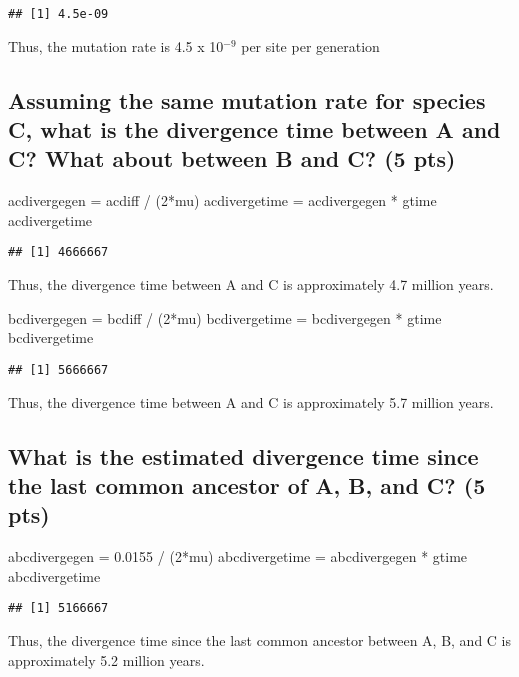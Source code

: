 \documentclass[]{article}
\newenvironment{Shaded}{\begin{snugshade}}{\end{snugshade}}
\newcommand{\DecValTok}[1]{\textcolor[rgb]{0.00,0.00,0.81}{{#1}}}
\newcommand{\FloatTok}[1]{\textcolor[rgb]{0.00,0.00,0.81}{{#1}}}
\newcommand{\StringTok}[1]{\textcolor[rgb]{0.31,0.60,0.02}{{#1}}}
\newcommand{\NormalTok}[1]{{#1}}
\begin{document}
\begin{verbatim}
## [1] 4.5e-09
\end{verbatim}

Thus, the mutation rate is 4.5 x 10$^{-9}$ per site per generation
\subsection{Assuming the same mutation rate for species C, what is the
divergence time between A and C? What about between B and C? (5 pts)}

\begin{Shaded}
\begin{Highlighting}[]
\NormalTok{acdivergegen =}\StringTok{ }\NormalTok{acdiff /}\StringTok{ }\NormalTok{(}\DecValTok{2}\NormalTok{*mu)}
\NormalTok{acdivergetime =}\StringTok{ }\NormalTok{acdivergegen *}\StringTok{ }\NormalTok{gtime}
\NormalTok{acdivergetime}
\end{Highlighting}
\end{Shaded}

\begin{verbatim}
## [1] 4666667
\end{verbatim}

Thus, the divergence time between A and C is approximately 4.7 million
years.

\begin{Shaded}
\begin{Highlighting}[]
\NormalTok{bcdivergegen =}\StringTok{ }\NormalTok{bcdiff /}\StringTok{ }\NormalTok{(}\DecValTok{2}\NormalTok{*mu)}
\NormalTok{bcdivergetime =}\StringTok{ }\NormalTok{bcdivergegen *}\StringTok{ }\NormalTok{gtime}
\NormalTok{bcdivergetime}
\end{Highlighting}
\end{Shaded}

\begin{verbatim}
## [1] 5666667
\end{verbatim}

Thus, the divergence time between A and C is approximately 5.7 million
years. 
\subsection{What is the estimated divergence time since the last common
ancestor of A, B, and C? (5 pts)}

\begin{Shaded}
\begin{Highlighting}[]
\NormalTok{abcdivergegen =}\StringTok{ }\FloatTok{0.0155} \NormalTok{/}\StringTok{ }\NormalTok{(}\DecValTok{2}\NormalTok{*mu)}
\NormalTok{abcdivergetime =}\StringTok{ }\NormalTok{abcdivergegen *}\StringTok{ }\NormalTok{gtime}
\NormalTok{abcdivergetime}
\end{Highlighting}
\end{Shaded}

\begin{verbatim}
## [1] 5166667
\end{verbatim}

Thus, the divergence time since the last common ancestor between A, B,
and C is approximately 5.2 million years.
\end{document}

